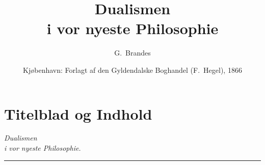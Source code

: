 \usepackage{hyperref}

\pagestyle{fancy}
\fancyhf{}
\fancyhead[LE,RO]{\thepage}
\fancyhead[LO]{\textit{\leftmark}}


\title{\textbf{Dualismen}\\[6pt]
  \large i vor nyeste Philosophie}
\author{G.\ Brandes}
\date{Kjøbenhavn: Forlagt af den Gyldendalske Boghandel (F.\ Hegel), 1866}

\usepackage{marginnote}
\newcommand{\opage}[1]{\marginnote{\footnotesize\textit{[#1]}}}
\newcommand{\apage}[1]{\marginnote{\footnotesize\textit{[#1]}}}

\maketitle
\thispagestyle{empty}
\newpage

\tableofcontents
\newpage

\chapter*{Titelblad og Indhold}
\label{ch:prelim}

\begin{center}
\opage{1}\emph{\Large Dualismen}\\[10pt]
\emph{i vor nyeste Philosophie.}\\[14pt]
\rule{2cm}{0.4pt}
\end{center}

